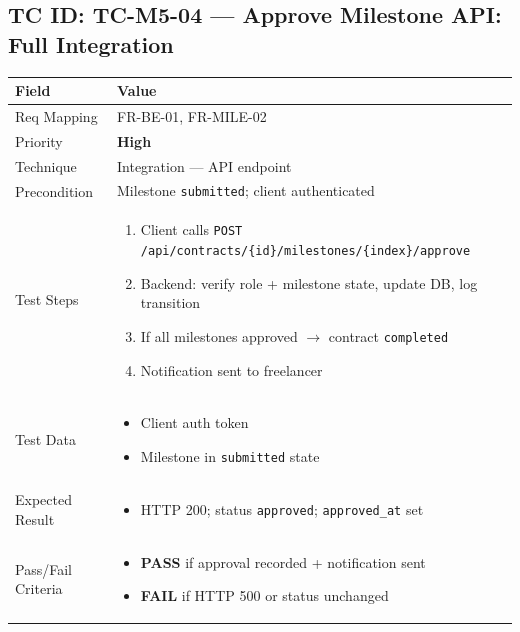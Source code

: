 \documentclass[12pt,a4paper]{article}
\newcommand{\sevhigh}{\textcolor{severityhigh}{\textbf{High}}}
\newcommand{\passresult}{\textcolor{passgreen}{\textbf{PASS}}}
\newcommand{\failresult}{\textcolor{failred}{\textbf{FAIL}}}
\begin{document}
\vspace{0.8cm}

\subsection{TC ID: TC-M5-04 --- Approve Milestone API: Full Integration}

\begin{tabular}{|p{}|p{}|}
\hline
\rowcolor{lightblue} \textbf{Field} & \textbf{Value} \\
\hline
Req Mapping & FR-BE-01, FR-MILE-02 \\
\hline
Priority & \sevhigh \\
\hline
Technique & Integration --- API endpoint \\
\hline
Precondition & Milestone \texttt{submitted}; client authenticated \\
\hline
Test Steps &
\begin{enumerate}[nosep, leftmargin=*]
  \item Client calls \texttt{POST /api/contracts/\{id\}/milestones/\{index\}/approve}
  \item Backend: verify role + milestone state, update DB, log transition
  \item If all milestones approved $\rightarrow$ contract \texttt{completed}
  \item Notification sent to freelancer
\end{enumerate} \\
\hline
Test Data &
\begin{itemize}[nosep, leftmargin=*]
  \item Client auth token
  \item Milestone in \texttt{submitted} state
\end{itemize} \\
\hline
Expected Result &
\begin{itemize}[nosep, leftmargin=*]
  \item HTTP 200; status \texttt{approved}; \texttt{approved\_at} set
\end{itemize} \\
\hline
Pass/Fail Criteria &
\begin{itemize}[nosep, leftmargin=*]
  \item \passresult{} if approval recorded + notification sent
  \item \failresult{} if HTTP 500 or status unchanged
\end{itemize} \\
\hline
\end{tabular}
\end{document}

